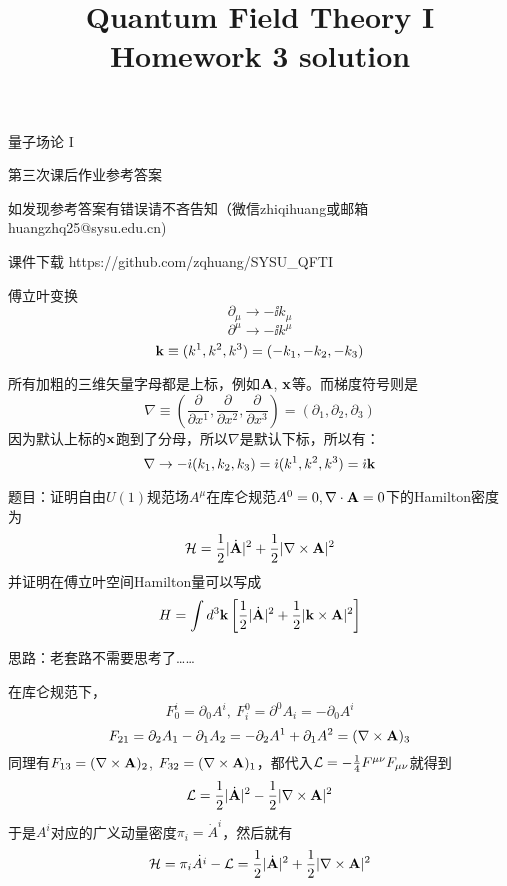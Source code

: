 \documentclass[CJK]{beamer}
\title{Quantum Field Theory I \\ Homework 3 solution}
\author{}
\date{}
\begin{document}
\begin{frame}
 
\begin{center}
\begin{Large}
\bch
量子场论 I 

{\vskip 0.3in}

第三次课后作业参考答案
\skipline
\skipline

如发现参考答案有错误请不吝告知（微信zhiqihuang或邮箱huangzhq25@sysu.edu.cn)
\ech
\end{Large}
\end{center}

\vskip 0.2in

\bch
课件下载
\ech
https://github.com/zqhuang/SYSU\_QFTI

\end{frame}

\begin{frame}
\bch
傅立叶变换
$$\partial_\mu \rightarrow -\ii k_\mu $$
$$\partial^\mu \rightarrow -\ii k^\mu $$
$${\mathbf{k}} \equiv (k^1, k^2, k^3) = (-k_1, -k_2, -k_3)$$

所有加粗的三维矢量字母都是上标，例如${\mathbf{A}}$, ${\mathbf{x}}$等。而梯度符号则是
$$\nabla \equiv (\frac{\partial}{\partial x^1}, \frac{\partial}{\partial x^2}, \frac{\partial}{\partial x^3}) = (\partial_1, \partial_2, \partial_3)$$ 
因为默认上标的${\mathbf{x}}$跑到了分母，所以$\nabla$是默认下标，所以有：
$$\nabla \rightarrow -{\dot{\imath}}(k_1, k_2, k_3) = {\dot{\imath}}(k^1,k^2,k^3) = {\dot{\imath}} {\mathbf{k}}$$

\ech
\end{frame}

\begin{frame}
\bch
题目：{\small 证明自由$U(1)$规范场$A^\mu$在库仑规范$A^0=0, \nabla\cdot {\mathbf{A}}=0$下的Hamilton密度为
$${\mathcal{H}} = \frac{1}{2}|\dot{{\mathbf{A}}}|^2 + \frac{1}{2}|\nabla\times {\mathbf{A}}|^2$$
并证明在傅立叶空间Hamilton量可以写成
$$H = \int d^3{\mathbf{k}}\left[\frac{1}{2}|\dot{{\mathbf{A}}}|^2 + \frac{1}{2}|{\mathbf{k}} \times {\mathbf{A}}|^2\right]$$}

\skipline
思路：老套路不需要思考了……
\ech
\end{frame}

\begin{frame}
\bch
在库仑规范下，
$$F_0^i = \partial_0 A^i,\ F^0_i = \partial^0 A_i = -\partial_0 A^i$$ 
$$F_{21}= \partial_2 A_1 - \partial_1 A_2 = - \partial_2 A^1 + \partial_1 A^2 = (\nabla \times {\mathbf{A}})_3$$
同理有$F_{13} = (\nabla\times {\mathbf{A}})_2$, $F_{32} = (\nabla\times {\mathbf{A}})_1$，都代入${\mathcal{L}} = -\frac{1}{4}F^{\mu\nu}F_{\mu\nu}$就得到
$${\mathcal{L}} = \frac{1}{2}|\dot{{\mathbf{A}}}|^2 - \frac{1}{2}|\nabla\times {\mathbf{A}}|^2$$
于是$A^i$对应的广义动量密度$\pi_i = \dot A^i$，然后就有
$${\mathcal{H}} = \pi_i\dot{A^i} - {\mathcal{L}} = \frac{1}{2}|\dot{{\mathbf{A}}}|^2 + \frac{1}{2}|\nabla\times {\mathbf{A}}|^2$$
\ech
\end{frame}
\end{document}
